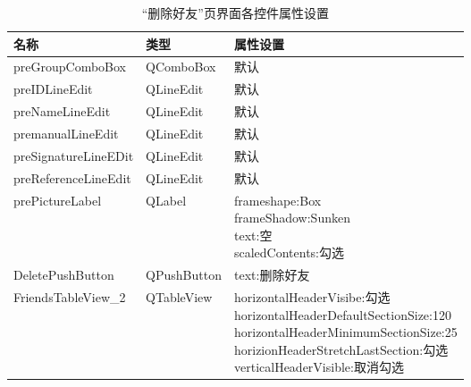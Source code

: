 \documentclass{progartcn}
\begin{document}
\begin{table}[H]
	\renewcommand{\arraystretch}{1.0}
	\centering
	\caption{\centering “删除好友”页界面各控件属性设置}
	\begin{tabular}{lll}
		\toprule[1.5pt]
		名称                   & 类型          & 属性设置                                                                                                                                                                  \\
		\midrule[1pt]
preGroupComboBox     & QComboBox   & 默认                                                                                                                                                                    \\
preIDLineEdit        & QLineEdit   & 默认                                                                                                                                                                    \\
preNameLineEdit      & QLineEdit   & 默认                                                                                                                                                                    \\
premanualLineEdit    & QLineEdit   & 默认                                                                                                                                                                    \\
preSignatureLineEDit & QLineEdit   & 默认                                                                                                                                                                    \\
preReferenceLineEdit & QLineEdit   & 默认                                                                                                                                                                    \\
prePictureLabel      & QLabel      & \makecell[l]{frameshape:Box\\ frameShadow:Sunken\\text:空\\scaledContents:勾选      }                                                                                                       \\
DeletePushButton     & QPushButton & text:删除好友                                                                                                                                                             \\
FriendsTableView\_2  & QTableView  & \makecell[l]{horizontalHeaderVisibe:勾选\\ horizontalHeaderDefaultSectionSize:120\\ horizontalHeaderMinimumSectionSize:25\\ horizionHeaderStretchLastSection:勾选\\ verticalHeaderVisible:取消勾选}
		\\
		\bottomrule[1.5pt]
	\end{tabular}
\end{table}
\end{document}
